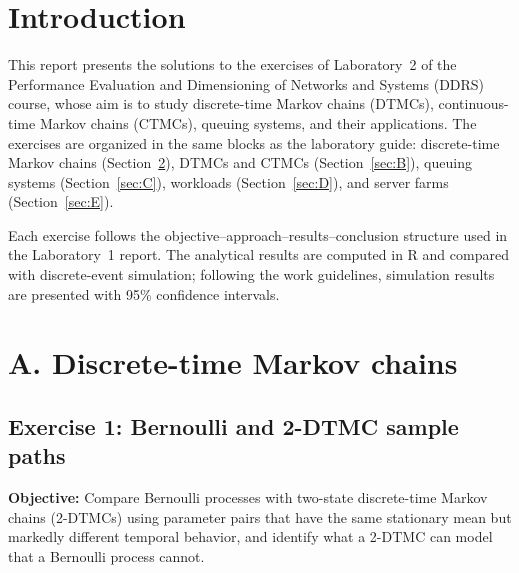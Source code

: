 ﻿\documentclass[12pt]{article}
\begin{document}
\thispagestyle{empty}
\setcounter{page}{0}
\newpage

\tableofcontents 
\newpage


\section{Introduction}

This report presents the solutions to the exercises of Laboratory~2 of the Performance Evaluation and Dimensioning of Networks and Systems (DDRS) course, whose aim is to study discrete-time Markov chains (DTMCs), continuous-time Markov chains (CTMCs), queuing systems, and their applications. The exercises are organized in the same blocks as the laboratory guide: discrete-time Markov chains (Section~\ref{sec:A}), DTMCs and CTMCs (Section~\ref{sec:B}), queuing systems (Section~\ref{sec:C}), workloads (Section~\ref{sec:D}), and server farms (Section~\ref{sec:E}).

Each exercise follows the objective--approach--results--conclusion structure used in the Laboratory~1 report. The analytical results are computed in R and compared with discrete-event simulation; following the work guidelines, simulation results are presented with 95\% confidence intervals.

\newpage

\section{A. Discrete-time Markov chains}\label{sec:A}

\subsection{Exercise 1: Bernoulli and 2-DTMC sample paths}

\textbf{Objective:} Compare Bernoulli processes with two-state discrete-time
Markov chains (2-DTMCs) using parameter pairs that have the same stationary mean
but markedly different temporal behavior, and identify what a 2-DTMC can model
that a Bernoulli process cannot.
\end{document}
